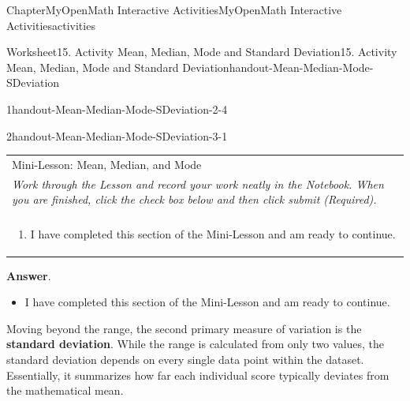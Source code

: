 \documentclass[oneside,10pt,]{book}
\newcommand{\blocktitlefont}{\relax}
\newcommand{\tabularfont}{\relax}
\newcommand{\ptxlistdisc}{\raisebox{0.3ex}{\textbullet}}
\newcommand{\terminology}[1]{\textbf{#1}}
\newlength{\fillinmaxwidth}
\newlength{\fillincontract}
\newlength{\charmaxwidth}\setlength{\charmaxwidth}{0.5em}
\newlength{\charminwidth}\setlength{\charminwidth}{0.1em}
\newlength{\fillinheight}
\newcommand{\fillintext}[1]{%
\setlength{\fillinmaxwidth}{#1\charmaxwidth}%
\setlength{\fillincontract}{#1\charminwidth}%
\setlength{\fillinheight}{\baselineskip}\addtolength{\fillinheight}{1.2pt}%
\strut\nobreak\leaders\vbox{\hrule width 0.3pt height 0.3pt \vskip -1.2pt}\hskip 1\fillinmaxwidth minus \fillincontract\nobreak\strut%
}
\begin{document}
\begin{chapterptx}{Chapter}{MyOpenMath Interactive Activities}{}{MyOpenMath Interactive Activities}{}{}{activities}
\begin{worksheet-section}{Worksheet}{15. Activity Mean, Median, Mode and Standard Deviation}{}{15. Activity Mean, Median, Mode and Standard Deviation}{}{}{handout-Mean-Median-Mode-SDeviation}
\begin{divisionexercise}{1}{}{}{handout-Mean-Median-Mode-SDeviation-2-4}
%
\end{divisionexercise}%
\clearpage
\begin{divisionexercise}{2}{}{}{handout-Mean-Median-Mode-SDeviation-3-1}%
\begin{center}%
{\tabularfont%
\begin{tabular}{l}
Mini-Lesson: Mean, Median, and Mode\tabularnewline[0pt]
\emph{Work through the Lesson and record your work neatly in the Notebook.  When you are finished, click the check box below and then click submit (Required).}\tabularnewline[0pt]
\tabularnewline[0pt]
\multicolumn{1}{m{0.2\linewidth}}{\raggedright%
%
\begin{enumerate}[label={(\alph*)}]
\item{}I have completed this section of the Mini-Lesson and am ready to continue.%
\end{enumerate}
%
}
\end{tabular}
}%
\end{center}%
\par\smallskip%
\noindent\textbf{\blocktitlefont Answer}.\hypertarget{handout-Mean-Median-Mode-SDeviation-3-1-2}{}\quad{}%
\begin{itemize}[label=\ptxlistdisc]
\item{}I have completed this section of the Mini-Lesson and am ready to continue.%
\end{itemize}
%
\end{divisionexercise}%
%
\clearpage
Moving beyond the range, the second primary measure of variation is the \terminology{standard deviation}. While the range is calculated from only two values, the standard deviation depends on every single data point within the dataset. Essentially, it summarizes how far each individual score typically deviates from the mathematical mean.%

\end{worksheet-section}
\end{chapterptx}
\end{document}
